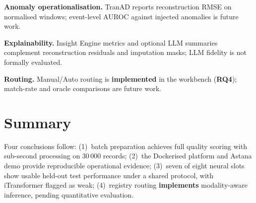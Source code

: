 \textbf{Anomaly operationalisation.} TranAD reports reconstruction RMSE on normalised windows; event-level AUROC against injected anomalies is future work.

\textbf{Explainability.} Insight Engine metrics and optional LLM summaries complement reconstruction residuals and imputation masks; LLM fidelity is not formally evaluated.

\textbf{Routing.} Manual/Auto routing is \textbf{implemented} in the workbench (\textbf{RQ4}); match-rate and oracle comparisons are future work.

\section{Summary}

Four conclusions follow: (1)~batch preparation achieves full quality scoring with sub-second processing on 30\,000 records; (2)~the Dockerised platform and Astana demo provide reproducible operational evidence; (3)~seven of eight neural slots show usable held-out test performance under a shared protocol, with iTransformer flagged as weak; (4)~registry routing \textbf{implements} modality-aware inference, pending quantitative evaluation.
